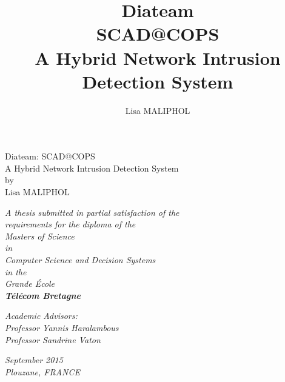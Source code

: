 \documentclass[12pt,]{article}
\title{Diateam\\SCAD@COPS\\A Hybrid Network Intrusion Detection System}
\author{Lisa MALIPHOL}
\date{}
\begin{document}
\maketitle


\thispagestyle{empty} \clearpage

\begin{center}

\vspace{30mm}

{\Huge Diateam: SCAD@COPS}\\
\bigskip
{\Huge A Hybrid Network Intrusion Detection System}\\
\vspace{15mm}
{\Large by}\\

\vspace{18mm}
{\huge Lisa MALIPHOL}\\

\vspace{25mm}

\textit{A thesis submitted in partial satisfaction of the}\\
\medskip
\textit{requirements for the diploma of the}\\
\medskip
\textit{Masters of Science}\\
\medskip
\textit{in}\\
\medskip
\textit{Computer Science and Decision Systems}\\
\medskip
\textit{in the}\\
\medskip
\textit{Grande École}\\
\medskip
\textbf{\textit{\Large Télécom Bretagne}}\\

\vspace{10mm}

\textit{Academic Advisors:}\\
\medskip
\textit{Professor Yannis Haralambous}\\
\medskip
\textit{Professor Sandrine Vaton}\\

\vspace{15mm}

\textit{September 2015}\\
\medskip
\textit{Plouzane, FRANCE}\\

\end{center}

\thispagestyle{empty} \clearpage

\tableofcontents
\end{document}
